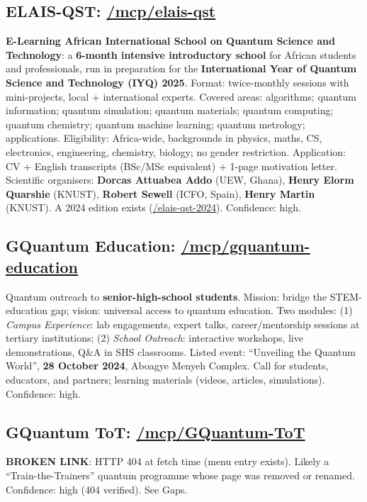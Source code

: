 \documentclass[11pt,a4paper]{article}
\begin{document}
\subsection{ELAIS-QST: \href{https://physics.knust.edu.gh/mcp/elais-qst}{/mcp/elais-qst}}
\textbf{E-Learning African International School on Quantum Science and Technology}: a \textbf{6-month intensive introductory school} for African students and professionals, run in preparation for the \textbf{International Year of Quantum Science and Technology (IYQ) 2025}. Format: twice-monthly sessions with mini-projects, local + international experts. Covered areas: algorithms; quantum information; quantum simulation; quantum materials; quantum computing; quantum chemistry; quantum machine learning; quantum metrology; applications. Eligibility: Africa-wide, backgrounds in physics, maths, CS, electronics, engineering, chemistry, biology; no gender restriction. Application: CV + English transcripts (BSc/MSc equivalent) + 1-page motivation letter. Scientific organisers: \textbf{Dorcas Attuabea Addo} (UEW, Ghana), \textbf{Henry Elorm Quarshie} (KNUST), \textbf{Robert Sewell} (ICFO, Spain), \textbf{Henry Martin} (KNUST). A 2024 edition exists (\href{https://physics.knust.edu.gh/elais-qst-2024}{/elais-qst-2024}). Confidence: high.

\subsection{GQuantum Education: \href{https://physics.knust.edu.gh/mcp/gquantum-education}{/mcp/gquantum-education}}
Quantum outreach to \textbf{senior-high-school students}. Mission: bridge the STEM-education gap; vision: universal access to quantum education. Two modules: (1) \emph{Campus Experience}: lab engagements, expert talks, career/mentorship sessions at tertiary institutions; (2) \emph{School Outreach}: interactive workshops, live demonstrations, Q\&A in SHS classrooms. Listed event: ``Unveiling the Quantum World'', \textbf{28 October 2024}, Aboagye Menyeh Complex. Call for students, educators, and partners; learning materials (videos, articles, simulations). Confidence: high.

\subsection{GQuantum ToT: \href{https://physics.knust.edu.gh/mcp/GQuantum-ToT}{/mcp/GQuantum-ToT}}
\textbf{BROKEN LINK}: HTTP 404 at fetch time (menu entry exists). Likely a ``Train-the-Trainers'' quantum programme whose page was removed or renamed. Confidence: high (404 verified). See Gaps.
\end{document}
